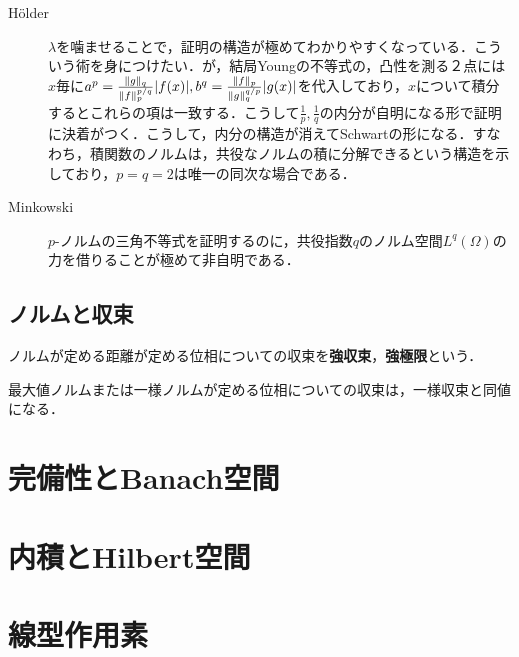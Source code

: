 \documentclass[uplatex, dvipdfmx]{jsreport}
\begin{document}
\begin{remarks}\mbox{}
    \begin{description}
        \item[Hölder] $\lambda$を噛ませることで，証明の構造が極めてわかりやすくなっている．こういう術を身につけたい．が，結局Youngの不等式の，凸性を測る２点には$x$毎に$a^p=\frac{\|g\|_q}{\|f\|^{p/q}_p}\lvert f(x)\rvert,b^q=\frac{\|f\|_p}{\|g\|_q^{q/p}}\lvert g(x)\rvert$を代入しており，$x$について積分するとこれらの項は一致する．こうして$\frac{1}{p},\frac{1}{q}$の内分が自明になる形で証明に決着がつく．こうして，内分の構造が消えてSchwartの形になる．すなわち，積関数のノルムは，共役なノルムの積に分解できるという構造を示しており，$p=q=2$は唯一の同次な場合である．
        \item[Minkowski] $p$-ノルムの三角不等式を証明するのに，共役指数$q$のノルム空間$L^q(\Omega)$の力を借りることが極めて非自明である．
    \end{description}
\end{remarks}

\section{ノルムと収束}

\begin{tcolorbox}[colframe=ForestGreen, colback=ForestGreen!10!white,breakable,colbacktitle=ForestGreen!40!white,coltitle=black,fonttitle=\bfseries\sffamily,
title=]
    ノルムが定める距離が定める位相についての収束を\textbf{強収束}，\textbf{強極限}という．
\end{tcolorbox}

\begin{example}
    最大値ノルムまたは一様ノルムが定める位相についての収束は，一様収束と同値になる．
\end{example}

\chapter{完備性とBanach空間}

\chapter{内積とHilbert空間}

\chapter{線型作用素}
\end{document}
